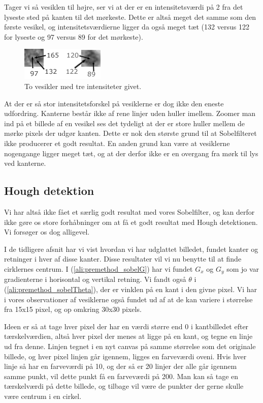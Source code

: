 Tager vi så vesiklen til højre, ser vi at der er en intensitetsværdi på 2 fra det lyseste sted på kanten til det mørkeste. Dette er altså meget det samme som den første vesikel, og intensitetsværdierne ligger da også meget tæt (132 versus 122 for lyseste og 97  versus 89 for det mørkeste). 

\begin{figure}[H]
	\centering
	\includegraphics[scale=5]{files/premethod/img/ves_colors.png}
	\caption{To vesikler med tre intensiteter givet.\label{fig:premethod_vescolors}}
\end{figure}

At der er så stor intensitetsforskel på vesiklerne er dog ikke den eneste udfordring. Kanterne består ikke af rene linjer uden huller imellem. Zoomer man ind på et billede af en vesikel ses det tydeligt at der er store huller mellem de mørke pixels der udgør kanten. Dette er nok den største grund til at Sobelfilteret ikke producerer et godt resultat. En anden grund kan være at vesiklerne nogengange ligger meget tæt, og at der derfor ikke er en overgang fra mørk til lys ved kanterne.

\subsection{Hough detektion}\label{premethod_hough}
Vi har altså ikke fået et særlig godt resultat med vores Sobelfilter, og kan derfor ikke gøre os store forhåbninger om at få et godt resultat med Hough detektionen. Vi forsøger os dog alligevel. 

I de tidligere afsnit har vi vist hvordan vi har udglattet billedet, fundet kanter og retninger i hver af disse kanter. Disse resultater vil vi nu benytte til at finde cirklernes centrum. I (\ref{ali:premethod_sobelG}) har vi fundet $G_x$ og $G_y$ som jo var gradienterne i horisontal og vertikal retning. Vi fandt også $\theta$ i (\ref{ali:premethod_sobelTheta}), der er vinklen på en kant i den givne pixel. Vi har i vores observationer af vesiklerne også fundet ud af at de kan variere i størrelse fra 15x15 pixel, og op omkring 30x30 pixels.

Ideen er så at tage hver pixel der har en værdi større end 0 i kantbilledet efter tærskelværdien, altså hver pixel der menes at ligge på en kant, og tegne en linje ud fra denne. Linjen tegnet i en nyt canvas på samme størrelse som det originale billede, og hver pixel linjen går igennem, ligges en farveværdi oveni. Hvis hver linje så har en farveværdi på 10, og der så er 20 linjer der alle går igennem samme punkt, vil dette punkt få en farveværdi på 200. Man kan så tage en tærskelværdi på dette billede, og tilbage vil være de punkter der gerne skulle være centrum i en cirkel. 

